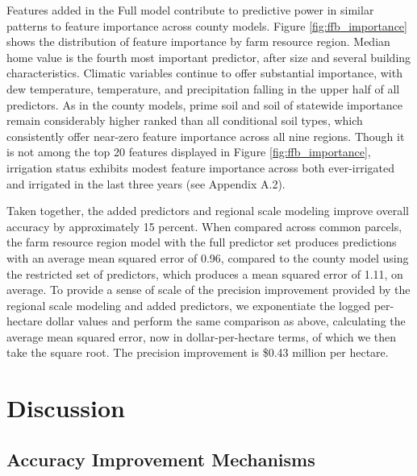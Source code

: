 \documentclass[12pt]{article}
\begin{document}
Features added in the Full model contribute to predictive power in similar patterns to feature importance across county models. Figure \ref{fig:ffb_importance} shows the distribution of feature importance by farm resource region. Median home value is the fourth most important predictor, after size and several building characteristics. Climatic variables continue to offer substantial importance, with dew temperature, temperature, and precipitation falling in the upper half of all predictors. As in the county models, prime soil and soil of statewide importance remain considerably higher ranked than all conditional soil types, which consistently offer near-zero feature importance across all nine regions. Though it is not among the top 20 features displayed in Figure \ref{fig:ffb_importance}, irrigation status exhibits modest feature importance across both ever-irrigated and irrigated in the last three years (see Appendix A.2).

Taken together, the added predictors and regional scale modeling improve overall accuracy by approximately 15 percent. When compared across common parcels, the farm resource region model with the full predictor set produces predictions with an average mean squared error of 0.96, compared to the county model using the restricted set of predictors, which produces a mean squared error of 1.11, on average. To provide a sense of scale of the precision improvement provided by the regional scale modeling and added predictors, we exponentiate the logged per-hectare dollar values and perform the same comparison as above, calculating the average mean squared error, now in dollar-per-hectare terms, of which we then take the square root. The precision improvement is \$0.43 million per hectare. 

\section{Discussion}

\subsection{Accuracy Improvement Mechanisms}
\end{document}
